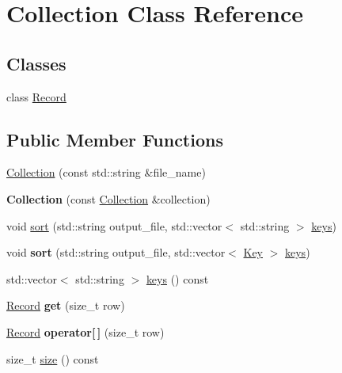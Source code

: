 \hypertarget{class_collection}{}\section{Collection Class Reference}
\label{class_collection}
\subsection*{Classes}
\begin{DoxyCompactItemize}
\item 
class \hyperlink{class_collection_1_1_record}{Record}
\end{DoxyCompactItemize}
\subsection*{Public Member Functions}
\begin{DoxyCompactItemize}
\item 
\hyperlink{class_collection_af4c8b62d3038e1ba081aef0c4ebd912d}{Collection} (const std\+::string \&file\+\_\+name)
\item 
\mbox{\label{class_collection_a368acd4908fd336e262c8724e2aa6dcf}} 
{\bfseries Collection} (const \hyperlink{class_collection}{Collection} \&collection)
\item 
void \hyperlink{class_collection_a88502cfa08bc6f1c9eff4974b95d53f3}{sort} (std\+::string output\+\_\+file, std\+::vector$<$ std\+::string $>$ \hyperlink{class_collection_aebff0d78673dac8453ebf51ba32d10eb}{keys})
\item 
\mbox{\label{class_collection_acd74867896574ea2ac631ec80f364e96}} 
void {\bfseries sort} (std\+::string output\+\_\+file, std\+::vector$<$ \hyperlink{struct_key}{Key} $>$ \hyperlink{class_collection_aebff0d78673dac8453ebf51ba32d10eb}{keys})
\item 
std\+::vector$<$ std\+::string $>$ \hyperlink{class_collection_aebff0d78673dac8453ebf51ba32d10eb}{keys} () const
\item 
\mbox{\label{class_collection_aa7ca7fea36c577e2067fa70f7d4b2c61}} 
\hyperlink{class_collection_1_1_record}{Record} {\bfseries get} (size\+\_\+t row)
\item 
\mbox{\label{class_collection_a5daca64e8f97ffa565ad18202f724fd6}} 
\hyperlink{class_collection_1_1_record}{Record} {\bfseries operator\mbox{[}$\,$\mbox{]}} (size\+\_\+t row)
\item 
size\+\_\+t \hyperlink{class_collection_ae6922104df8b79051656b77f5019750f}{size} () const
\end{DoxyCompactItemize}
